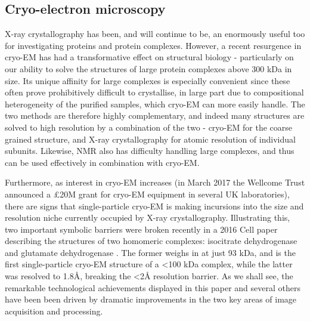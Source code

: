 \documentclass[a4paper,11pt,twoside,openright]{scrbook}
\begin{document}
\subsection{Cryo-electron microscopy}
X-ray crystallography has been, and will continue to be, an enormously useful too for investigating proteins and protein complexes. However, a recent resurgence in cryo-EM has had a transformative effect on structural biology - particularly on our ability to solve the structures of large protein complexes above 300 kDa in size. Its unique affinity for large complexes is especially convenient since these often prove prohibitively difficult to crystallise, in large part due to compositional heterogeneity of the purified samples, which cryo-EM can more easily handle. The two methods are therefore highly complementary, and indeed many structures are solved to high resolution by a combination of the two - cryo-EM for the coarse grained structure, and X-ray crystallography for atomic resolution of individual subunits. Likewise, NMR also has difficulty handling large complexes, and thus can be used effectively in combination with cryo-EM.

Furthermore, as interest in cryo-EM increases (in March 2017 the Wellcome Trust announced a £20M grant for cryo-EM equipment in several UK laboratories), there are signs that single-particle cryo-EM is making incursions into the size and resolution niche currently occupied by X-ray crystallography. Illustrating this, two important symbolic barriers were broken recently in a 2016 Cell paper describing the structures of two homomeric complexes: isocitrate dehydrogenase and glutamate dehydrogenase \cite{Merk2016}. The former weighs in at just 93 kDa, and is the first single-particle cryo-EM structure of a <100 kDa complex, while the latter was resolved to 1.8Å, breaking the <2Å resolution barrier. As we shall see, the remarkable technological achievements displayed in this paper and several others have been been driven by dramatic improvements in the two key areas of image acquisition and processing\cite{Bai2015}.
\end{document}
